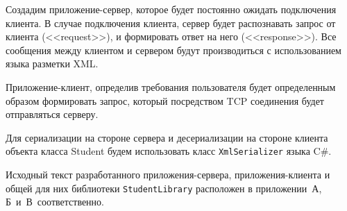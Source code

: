 Создадим приложение-сервер, которое будет постоянно ожидать подключения клиента.
В случае подключения клиента, сервер будет распознавать запрос от клиента (<<request>>),
и формировать ответ на него (<<response>>). Все сообщения между клиентом и сервером
будут производиться с использованием языка разметки XML.

Приложение-клиент, определив требования пользователя будет определенным образом
формировать запрос, который посредством TCP соединения будет отправляться серверу.

Для сериализации на стороне сервера и десериализации на стороне клиента объекта
класса Student будем использовать класс \texttt{XmlSerializer} языка C\#.

Исходный текст разработанного приложения-сервера, приложения-клиента и общей
для них библиотеки \texttt{StudentLibrary} расположен в приложении~А,
Б~и~В~соответственно.

\newpage
